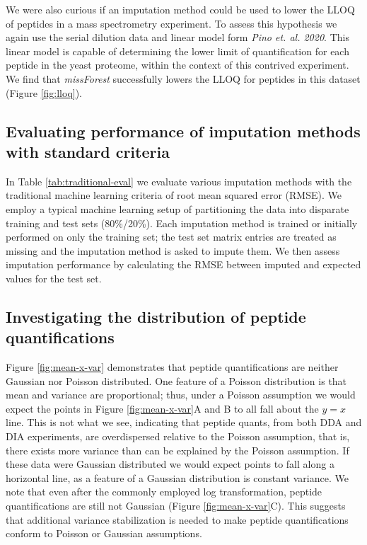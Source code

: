 \documentclass{article}
\newcommand{\fixme}[1]{{\color{red}{#1}}}
\begin{document}
We were also curious if an imputation method could be used to lower the LLOQ of peptides in a mass spectrometry experiment. To assess this hypothesis we again use the serial dilution data and linear model form \textit{Pino et. al. 2020}. This linear model is capable of determining the lower limit of quantification for each peptide in the yeast proteome, within the context of this contrived experiment. We find that \textit{missForest} successfully lowers the LLOQ for \fixme{[xx]} peptides in this dataset (Figure \ref{fig:lloq}).

\subsection{Evaluating performance of imputation methods with standard criteria}

In Table \ref{tab:traditional-eval} we evaluate various imputation methods with the traditional machine learning criteria of root mean squared error (RMSE). We employ a typical machine learning setup of partitioning the data into disparate training and test sets (80\%/20\%). Each imputation method is trained or initially performed on only the training set; the test set matrix entries are treated as missing and the imputation method is asked to impute them. We then assess imputation performance by calculating the RMSE between imputed and expected values for the test set. 

\subsection{Investigating the distribution of peptide quantifications}

Figure \ref{fig:mean-x-var} demonstrates that peptide quantifications are neither Gaussian nor Poisson distributed. One feature of a Poisson distribution is that mean and variance are proportional; thus, under a Poisson assumption we would expect the points in Figure \ref{fig:mean-x-var}A and B to all fall about the $y=x$ line. This is not what we see, indicating that peptide quants, from both DDA and DIA experiments, are overdispersed relative to the Poisson assumption, that is, there exists more variance than can be explained by the Poisson assumption. If these data were Gaussian distributed we would expect points to fall along a horizontal line, as a feature of a Gaussian distribution is constant variance. We note that even after the commonly employed log transformation, peptide quantifications are still not Gaussian (Figure \ref{fig:mean-x-var}C). This suggests that additional variance stabilization is needed to make peptide quantifications conform to Poisson or Gaussian assumptions. 
\end{document}

